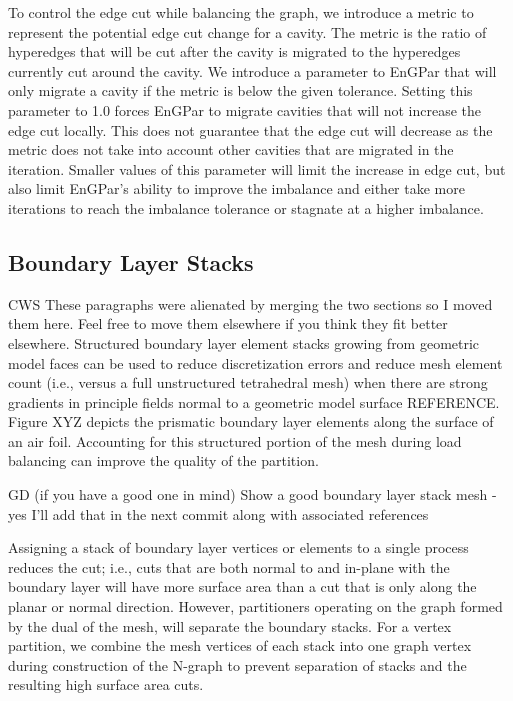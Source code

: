 \documentclass[conference]{IEEEtran}
\begin{document}
To control the edge cut while balancing the graph, we introduce a metric to represent the
potential edge cut change for a cavity. The metric is the ratio of hyperedges that will be cut
after the cavity is migrated to the hyperedges currently cut around the cavity. We introduce a
parameter to EnGPar that will only migrate a cavity if the metric is below the given tolerance.
Setting this parameter to 1.0 forces EnGPar to migrate cavities that will not increase the edge
cut locally. This does not guarantee that the edge cut will decrease as the metric does not take
into account other cavities that are migrated in the iteration. Smaller values of this
parameter will limit the increase in edge cut, but also limit EnGPar's ability to improve the
imbalance and either take more iterations to reach the imbalance tolerance or stagnate at a
higher imbalance.

\subsection{Boundary Layer Stacks}

{\color{red} CWS These paragraphs were alienated by merging the two sections so I moved them here. Feel free to move them elsewhere if you think they fit better elsewhere.}
Structured boundary layer element stacks growing from geometric model faces can
be used to reduce discretization errors and reduce mesh element count (i.e., versus
a full unstructured tetrahedral mesh) when there are strong gradients in
principle fields normal to a geometric model surface {\color{red} REFERENCE}.
Figure XYZ depicts the prismatic boundary layer elements along the surface of an
air foil.
Accounting for this structured portion of the mesh during load balancing can
improve the quality of the partition.

{\color{red} GD (if you have a good one in mind) Show a good boundary layer
stack mesh - yes I'll add that in the next commit along with associated
references}

Assigning a stack of boundary layer vertices or
elements to a single process reduces the cut; i.e., cuts that are both normal to
and in-plane with the boundary layer will have more surface area than a cut that
is only along the planar or normal direction.
However, partitioners
operating on the graph formed by the dual of the mesh, will separate
the boundary stacks. For a vertex partition, we combine the mesh vertices of each stack into one graph vertex
during construction of the N-graph to prevent separation of stacks and the
resulting high surface area cuts. 
\end{document}
